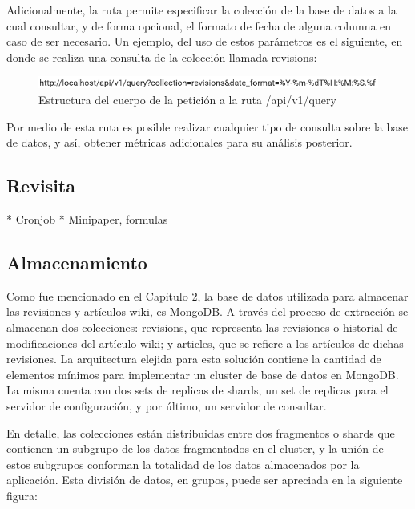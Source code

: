 Adicionalmente, la ruta permite especificar la colección de la base de datos a la cual consultar, y de forma opcional,
el formato de fecha de alguna columna en caso de ser necesario.
Un ejemplo, del uso de estos parámetros es el siguiente, en donde se realiza una consulta de la colección llamada revisions:

\begin{figure}[H]
	\centering
		\includegraphics[width=1\textwidth]{figures/query_url}
	\caption{Estructura del cuerpo de la petición a la ruta /api/v1/query}
	\label{fig:query_url}
\end{figure}

Por medio de esta ruta es posible realizar cualquier tipo de consulta sobre la base de datos, y así, obtener métricas
adicionales para su análisis posterior.

\subsection{Revisita}

* Cronjob
* Minipaper, formulas

\subsection{Almacenamiento}

Como fue mencionado en el Capitulo 2, la base de datos utilizada para almacenar las revisiones y artículos wiki, es MongoDB.
A través del proceso de extracción se almacenan dos colecciones:
revisions, que representa las revisiones o historial de modificaciones del artículo wiki;
y articles, que se refiere a los artículos de dichas revisiones.
La arquitectura elejida para esta solución contiene la cantidad de elementos mínimos para implementar un cluster de base de datos en MongoDB.
La misma cuenta con dos sets de replicas de shards, un set de replicas para el servidor de configuración, y por último,
un servidor de consultar.

En detalle, las colecciones están distribuidas entre dos fragmentos o shards que contienen un subgrupo de los datos fragmentados en el cluster, y la unión de estos subgrupos conforman la totalidad de los datos almacenados por la aplicación.
Esta división de datos, en grupos, puede ser apreciada en la siguiente figura:


